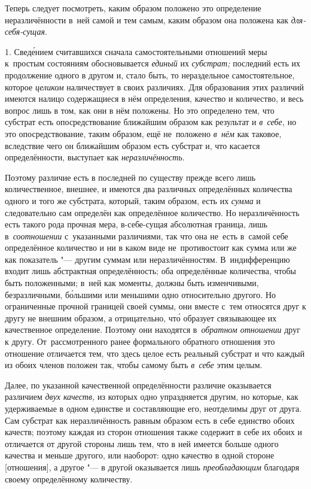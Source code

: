 
Теперь следует посмотреть, каким образом положено это определение
неразличённости в~ней самой и тем самым, каким образом она положена
как {\em для-себя-сущая}.

1. Свед\'{е}нием считавшихся сначала самостоятельными отношений меры
к~простым состояниям обосновывается {\em единый} их {\em субстрат;} последний
есть их продолжение одного в другом и, стало быть, то нераздельное
самостоятельное, которое {\em целиком} наличествует в своих различиях.
Для образования этих различий имеются налицо содержащиеся в нём определения,
качество и количество, и весь вопрос лишь в том, как они в нём положены.
Но это определено тем, что субстрат есть опосредствование ближайшим образом
как результат и {\em в~себе,} но это опосредствование, таким образом, ещё
не~положено {\em в~нём} как таковое, вследствие чего он ближайшим образом есть
субстрат и, что касается определённости, выступает как {\em неразличённость}.

Поэтому различие есть в последней по существу прежде всего лишь количественное,
внешнее, и имеются два различных определённых количества одного и того же
субстрата, который, таким образом, есть их {\em сумма} и следовательно сам
определён как определённое количество. Но неразличённость есть такого рода
прочная мера, в-себе-сущая абсолютная граница, лишь в~{\em соотношении}
с~указанными различиями, так что она не~есть в~самой себе определённое
количество и ни в каком виде не~противостоит как сумма или же как
показатель "--- другим суммам или неразличённостям. В~индифференцию входит
лишь абстрактная определённость; оба определённые количества, чтобы быть
положенными; в~ней как моменты, должны быть изменчивыми, безразличными,
б\'{о}льшими или меньшими одно относительно другого. Но ограниченные прочной
границей своей суммы, они вместе с~тем относятся друг к другу не внешним
образом, а отрицательно, чт\'{о} образует связывающее их качественное
определение. Поэтому они находятся в~{\em обратном отношении} друг к другу.
От~рассмотренного ранее формального обратного отношения это отношение
отличается тем, что здесь целое есть реальный субстрат и что каждый из обоих
членов положен так, чтобы самому быть {\em в~себе} этим целым.

Далее, по указанной качественной определённости различие оказывается различием
{\em двух качеств,} из которых одно упраздняется другим, но которые, как
удерживаемые в одном единстве и составляющие его, неотделимы друг от друга. Сам
субстрат как неразличённость равным образом есть в себе единство обоих качеств;
поэтому каждая из сторон отношения также содержит в себе их обоих и отличается
от другой стороны лишь тем, что в ней имеется больше одного качества и меньше
другого, или наоборот: одно качество в одной стороне [отношения], а другое "--- в другой
оказывается лишь {\em преобладающим} благодаря своему определённому количеству.

